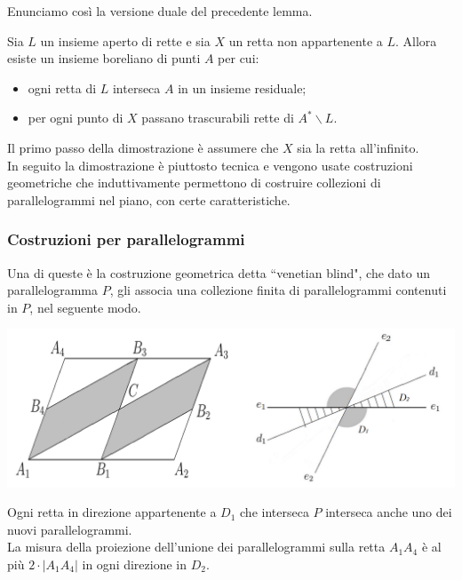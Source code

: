 \documentclass[11pt]{beamer} %
\newcommand{\<}{\langle}
\renewcommand{\>}{\rangle}
\theoremstyle{theorem}
\theoremstyle{theorem}
\theoremstyle{theorem}
\theoremstyle{theorem}
\theoremstyle{theorem}
\begin{document}
\begin{frame}
	Enunciamo così la versione duale del precedente lemma.
	
	\begin{lemma}[2]
	Sia $L$ un insieme aperto di rette e sia $X$ un retta non appartenente a $L$. Allora esiste un insieme boreliano di punti $A$ per cui:\\
	\begin{itemize}
		\item ogni retta di $L$ interseca $A$ in un insieme residuale;\\
		\item per ogni punto di $X$ passano trascurabili rette di $A^{*} \backslash L$.\\
	\end{itemize}

	\medskip
	
	\end{lemma}
	\pause
	Il primo passo della dimostrazione è assumere che $X$ sia la retta all'infinito.\\
	\pause
	In seguito la dimostrazione è piuttosto tecnica e vengono usate costruzioni geometriche che induttivamente permettono di costruire collezioni di parallelogrammi nel piano, con certe caratteristiche.\\
\end{frame}	



\begin{frame}[fragile]
	\frametitle{Costruzioni per parallelogrammi}
	Una di queste è la costruzione geometrica detta ``venetian blind", che dato un parallelogramma $P$, gli associa una collezione finita di parallelogrammi contenuti in $P$, nel seguente modo.
	\pause
	\begin{center}
		\includegraphics[width=0.9\columnwidth]{prova1.png}
	\end{center}
	\pause
	Ogni retta in direzione appartenente a $D_1$ che interseca $P$ interseca anche uno dei nuovi parallelogrammi.\\
	\pause
	La misura della proiezione dell'unione dei parallelogrammi sulla retta $A_{1} A_{4}$ è al più $2 \cdot \left|A_{1} A_{4}\right|$ in ogni direzione in $D_2$.
\end{frame}
\end{document}
